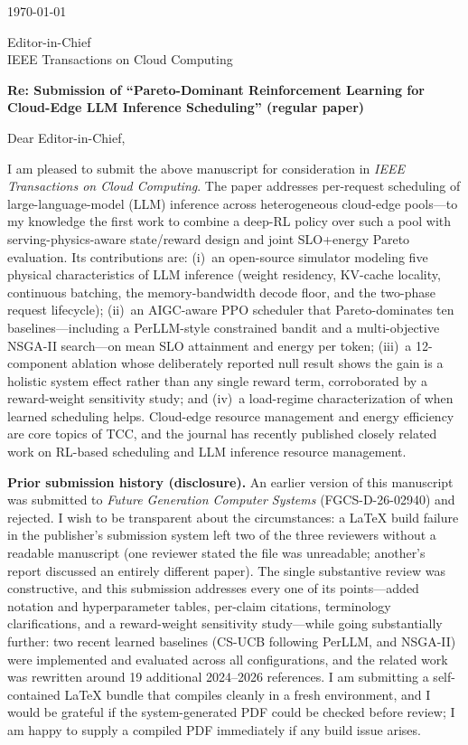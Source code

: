 \documentclass[10pt]{article}
\begin{document}
\today

Editor-in-Chief\\
IEEE Transactions on Cloud Computing

\textbf{Re: Submission of ``Pareto-Dominant Reinforcement Learning
for Cloud-Edge LLM Inference Scheduling'' (regular paper)}

Dear Editor-in-Chief,

I am pleased to submit the above manuscript for consideration in
\emph{IEEE Transactions on Cloud Computing}. The paper addresses
per-request scheduling of large-language-model (LLM) inference
across heterogeneous cloud-edge pools---to my knowledge the first
work to combine a deep-RL policy over such a pool with
serving-physics-aware state/reward design and joint SLO+energy
Pareto evaluation. Its contributions are: (i)~an open-source
simulator modeling five physical characteristics of LLM inference
(weight residency, KV-cache locality, continuous batching, the
memory-bandwidth decode floor, and the two-phase request
lifecycle); (ii)~an AIGC-aware PPO scheduler that Pareto-dominates
ten baselines---including a PerLLM-style constrained bandit and a
multi-objective NSGA-II search---on mean SLO attainment and energy
per token; (iii)~a 12-component ablation whose deliberately
reported null result shows the gain is a holistic system effect
rather than any single reward term, corroborated by a reward-weight
sensitivity study; and (iv)~a load-regime characterization of when
learned scheduling helps. Cloud-edge resource management and energy
efficiency are core topics of TCC, and the journal has recently
published closely related work on RL-based scheduling and LLM
inference resource management.

\textbf{Prior submission history (disclosure).} An earlier version
of this manuscript was submitted to \emph{Future Generation
Computer Systems} (FGCS-D-26-02940) and rejected. I wish to be
transparent about the circumstances: a LaTeX build failure in the
publisher's submission system left two of the three reviewers
without a readable manuscript (one reviewer stated the file was
unreadable; another's report discussed an entirely different
paper). The single substantive review was constructive, and this
submission addresses every one of its points---added notation and
hyperparameter tables, per-claim citations, terminology
clarifications, and a reward-weight sensitivity study---while going
substantially further: two recent learned baselines (CS-UCB
following PerLLM, and NSGA-II) were implemented and evaluated
across all configurations, and the related work was rewritten
around 19 additional 2024--2026 references. I am submitting a
self-contained LaTeX bundle that compiles cleanly in a fresh
environment, and I would be grateful if the system-generated PDF
could be checked before review; I am happy to supply a compiled PDF
immediately if any build issue arises.
\end{document}

